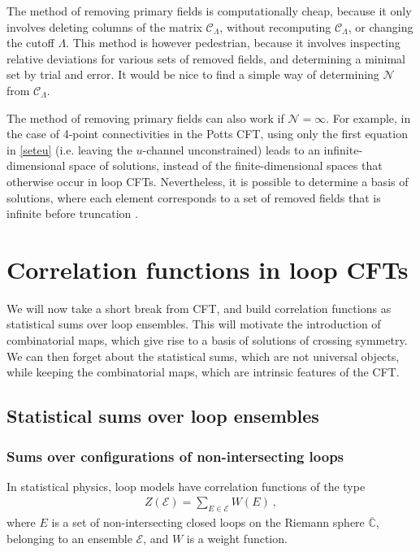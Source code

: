 \documentclass[12pt, a4paper]{article}
\begin{document}
The method of removing primary fields is computationally cheap, because it only involves deleting columns of the matrix $\mathcal{C}_\Lambda$, without recomputing $\mathcal{C}_\Lambda$, or changing the cutoff $\Lambda$. This method is however pedestrian, because it involves inspecting relative deviations for various sets of removed fields, and determining a minimal set by trial and error. It would be nice to find a simple way of determining $\mathcal{N}$ from $\mathcal{C}_\Lambda$. 

The method of removing primary fields can also work if $\mathcal{N}=\infty$. For example, in the case of 4-point connectivities in the Potts CFT, using only the first equation in \eqref{seteu} (i.e. leaving the $u$-channel unconstrained) leads to an infinite-dimensional space of solutions, instead of the finite-dimensional spaces that otherwise occur in loop CFTs. Nevertheless, it is possible to determine a basis of solutions, where each element corresponds to a set of removed fields that is infinite before truncation \cite{nr20}.


\section{Correlation functions in loop CFTs} \label{sec:cloop}

We will now take a short break from CFT, and build correlation functions as statistical sums over loop ensembles. This will motivate the introduction of combinatorial maps, which give rise to a basis of solutions of crossing symmetry. We can then forget about the statistical sums, which are not universal objects, while keeping the combinatorial maps, which are intrinsic features of the CFT.

\subsection{Statistical sums over loop ensembles}

\subsubsection{Sums over configurations of non-intersecting loops}

In statistical physics, loop models have correlation functions of the type
\begin{align}
 Z(\mathcal{E}) = \sum_{E\in\mathcal{E}} W(E)\ , 
\end{align}
where $E$ is a set of non-intersecting closed loops on the Riemann sphere $\overline{\mathbb{C}}$, belonging to an ensemble $\mathcal{E}$, and $W$ is a weight function. 
\end{document}
